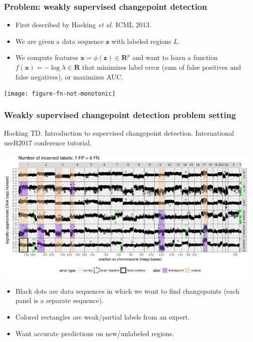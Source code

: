 \documentclass[t]{beamer}
\begin{document}
\begin{frame}
  \frametitle{Problem: weakly supervised changepoint detection}
  \begin{itemize}
  \item First described by Hocking \emph{et al.} ICML 2013.
  \item We are given a data sequence $\mathbf z$ with labeled regions
    $L$.
  \item We compute features $\mathbf x=\phi(\mathbf z)\in\mathbf R^p$
    and want to learn a function $f(\mathbf x)=-\log\lambda\in\mathbf R$ that minimizes label error (sum of false positives and false negatives), or maximizes AUC.
  \end{itemize}

  \texttt{[image: figure-fn-not-monotonic]}

\end{frame}

\begin{frame}
  \frametitle{Weakly supervised changepoint detection problem setting}

  {\scriptsize Hocking TD. Introduction to supervised changepoint
    detection. International useR2017 conference tutorial.}

  \includegraphics[width=\textwidth]{neuroblastoma-ok-relapse-supervised}

  \begin{itemize}
  \item Black dots are data sequences in which we want to find
    changepoints (each panel is a separate sequence).
  \item Colored rectangles are weak/partial labels from an expert.
  \item Want accurate predictions on new/unlabeled regions.
  \end{itemize}
\end{frame}
\end{document}
